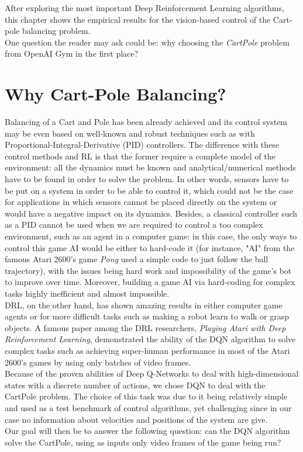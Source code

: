 \label{ch:CartPole}

After exploring the most important Deep Reinforcement Learning algorithms, this chapter shows the empirical results for the vision-based control of the Cart-pole balancing problem.
\\
\indent One question the reader may ask could be: why choosing the \textit{CartPole} problem from OpenAI Gym in the first place? 

\section{Why Cart-Pole Balancing?}
\label{sec:whyCartPole}

Balancing of a Cart and Pole has been already achieved and its control system may be even based on well-known and robust techniques such as with Proportional-Integral-Derivative (PID) controllers. The difference with these control methods and RL is that the former require a complete model of the environment: all the dynamics must be known and analytical/numerical methods have to be found in order to solve the problem. In other words, sensors have to be put on a system in order to be able to control it, which could not be the case for applications in which sensors cannot be placed directly on the system or would have a negative impact on its dynamics. Besides, a classical controller such as a PID cannot be used when we are required to control a too complex environment, such as an agent in a computer game: in this case, the only ways to control this game AI would be either to hard-code it (for instance, "AI" from the famous Atari 2600's game \textit{Pong} used a simple code to just follow the ball trajectory), with the issues being hard work and impossibility of the game's bot to improve over time. Moreover, building a game AI via hard-coding for complex tasks highly inefficient and almost impossible.
\\
\indent DRL, on the other hand, has shown amazing results in either computer game agents or for more difficult tasks such as making a robot learn to walk or grasp objects. A famous paper among the DRL researchers, \textit{Playing Atari with Deep Reinforcement Learning}, demonstrated the ability of the DQN algorithm to solve complex tasks such as achieving super-human performance in most of the Atari 2600's games by using only batches of video frames.
\\
\indent
Because of the proven abilities of Deep Q-Networks to deal with high-dimensional states with a discrete number of actions, we chose DQN to deal with the CartPole problem. The choice of this task was due to it being relatively simple and used as a test benchmark of control algorithms, yet challenging since in our case no information about velocities and positions of the system are give.
\\
\indent
Our goal will then be to answer the following question: can the DQN algorithm solve the CartPole, using as inputs only video frames of the game being run?

